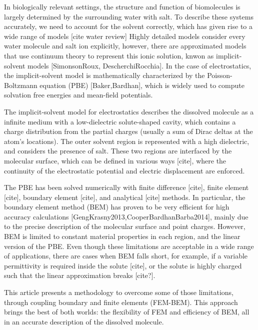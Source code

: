 In biologically relevant settings, the structure and function of biomolecules is largely determined by the surrounding water with salt. 
To describe these systems accurately, we need to account for the solvent correctly, which has given rise to a wide range of models [cite water review]
Highly detailed models consider every water molecule and salt ion explicitly, however, there are approximated models that use continuum theory to represent this ionic solution, knwon as implicit-solvent models [SimonsonRoux, DescherchiRocchia].
In the case of electrostatics, the implicit-solvent model is mathematically characterized by the Poisson-Boltzmann equation (PBE) [Baker,Bardhan], which is widely used to compute solvation free energies and mean-field potentials.

The implicit-solvent model for electrostatics describes the dissolved molecule as a infinite medium with a low-dielectric solute-shaped cavity, which contains a charge distribution from the partial charges (usually a sum of Dirac deltas at the atom's locations).
The outer solvent region is represented with a high dielectric, and considers the presence of salt.
These two regions are interfaced by the molecular surface, which can be defined in various ways [cite], where the continuity of the electrostatic potential and electric displacement are enforced.

The PBE has been solved numerically with finite difference [cite], finite element [cite], boundary element [cite], and analytical [cite] methods.
In particular, the boundary element method (BEM) has proven to be very efficient for high accuracy calculations [GengKrasny2013,CooperBardhanBarba2014], mainly due to the precise description of the molecular surface and point charges. 
However, BEM is limited to constant material properties in each region, and the linear version of the PBE. 
Even though these limitations are acceptable in a wide range of applications, there are cases when BEM falls short, for example, if a variable permittivity is required inside the solute [cite], or the solute is highly charged such that the linear approximation breaks [cite?].

This article presents a methodology to overcome some of those limitations, through coupling boundary and finite elements (FEM-BEM).
This approach brings the best of both worlds: the flexibility of FEM and efficiency of BEM, all in an accurate description of the dissolved molecule.